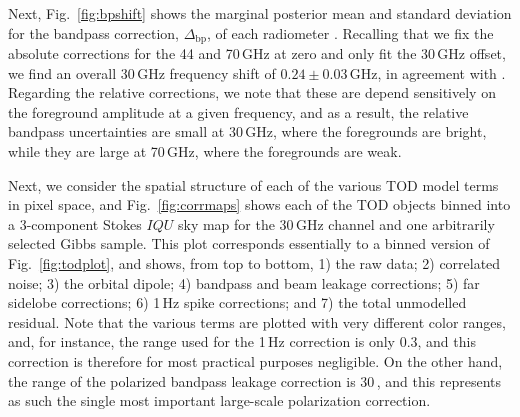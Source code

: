 \documentclass[twocolumn]{aa}
\newcommand{\BP}{\textsc{BeyondPlanck}}
\begin{document}




Next, Fig.~\ref{fig:bpshift} shows the marginal posterior mean and
standard deviation for the bandpass correction,
$\Delta_{\mathrm{bp}}$, of each radiometer \citep{bp09}. Recalling
that we fix the absolute corrections for the 44 and 70\,GHz at zero
and only fit the 30\,GHz offset, we find an overall 30\,GHz frequency
shift of $0.24\pm0.03\,\mathrm{GHz}$, in agreement with
\citet{planck2014-a12}. Regarding the relative corrections, we note
that these are depend sensitively on the foreground amplitude at a
given frequency, and as a result, the relative bandpass uncertainties
are small at 30\,GHz, where the foregrounds are bright, while they are
large at 70\,GHz, where the foregrounds are weak.

Next, we consider the spatial structure of each of the various TOD
model terms in pixel space, and Fig.~\ref{fig:corrmaps} shows each of
the TOD objects binned into a 3-component Stokes $IQU$ sky map for the
30\,GHz channel and one arbitrarily selected Gibbs sample. This plot
corresponds essentially to a binned version of Fig.~\ref{fig:todplot},
and shows, from top to bottom, 1) the raw data; 2) correlated noise;
3) the orbital dipole; 4) bandpass and beam leakage corrections; 5)
far sidelobe corrections; 6) 1\,Hz spike corrections; and 7) the total
unmodelled residual. Note that the various terms are plotted with very
different color ranges, and, for instance, the range used for the
1\,Hz correction is only 0.3\muK, and this correction is therefore for
most practical purposes negligible. On the other hand, the range of
the polarized bandpass leakage correction is 30\,\muK, and this
represents as such the single most important large-scale polarization
correction. 
\end{document}
